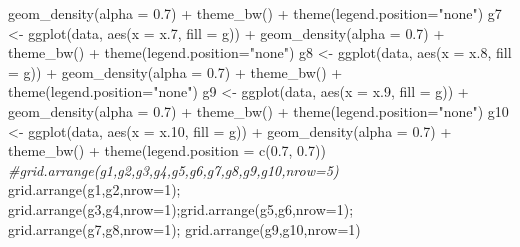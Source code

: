 \documentclass[
]{article}
\newenvironment{Shaded}{\begin{snugshade}}{\end{snugshade}}
\newcommand{\AttributeTok}[1]{\textcolor[rgb]{0.77,0.63,0.00}{#1}}
\newcommand{\CommentTok}[1]{\textcolor[rgb]{0.56,0.35,0.01}{\textit{#1}}}
\newcommand{\DecValTok}[1]{\textcolor[rgb]{0.00,0.00,0.81}{#1}}
\newcommand{\FloatTok}[1]{\textcolor[rgb]{0.00,0.00,0.81}{#1}}
\newcommand{\FunctionTok}[1]{\textcolor[rgb]{0.00,0.00,0.00}{#1}}
\newcommand{\NormalTok}[1]{#1}
\newcommand{\OtherTok}[1]{\textcolor[rgb]{0.56,0.35,0.01}{#1}}
\newcommand{\SpecialCharTok}[1]{\textcolor[rgb]{0.00,0.00,0.00}{#1}}
\newcommand{\StringTok}[1]{\textcolor[rgb]{0.31,0.60,0.02}{#1}}
\begin{document}
\begin{Shaded}
\begin{Highlighting}[]
  \FunctionTok{geom\_density}\NormalTok{(}\AttributeTok{alpha =} \FloatTok{0.7}\NormalTok{) }\SpecialCharTok{+} \FunctionTok{theme\_bw}\NormalTok{() }\SpecialCharTok{+}
    \FunctionTok{theme}\NormalTok{(}\AttributeTok{legend.position=}\StringTok{"none"}\NormalTok{)}
\NormalTok{g7 }\OtherTok{\textless{}{-}} \FunctionTok{ggplot}\NormalTok{(data, }\FunctionTok{aes}\NormalTok{(}\AttributeTok{x =}\NormalTok{ x}\FloatTok{.7}\NormalTok{, }\AttributeTok{fill =}\NormalTok{ g)) }\SpecialCharTok{+}
  \FunctionTok{geom\_density}\NormalTok{(}\AttributeTok{alpha =} \FloatTok{0.7}\NormalTok{) }\SpecialCharTok{+} \FunctionTok{theme\_bw}\NormalTok{() }\SpecialCharTok{+}
    \FunctionTok{theme}\NormalTok{(}\AttributeTok{legend.position=}\StringTok{"none"}\NormalTok{)}
\NormalTok{g8 }\OtherTok{\textless{}{-}} \FunctionTok{ggplot}\NormalTok{(data, }\FunctionTok{aes}\NormalTok{(}\AttributeTok{x =}\NormalTok{ x}\FloatTok{.8}\NormalTok{, }\AttributeTok{fill =}\NormalTok{ g)) }\SpecialCharTok{+}
  \FunctionTok{geom\_density}\NormalTok{(}\AttributeTok{alpha =} \FloatTok{0.7}\NormalTok{) }\SpecialCharTok{+} \FunctionTok{theme\_bw}\NormalTok{() }\SpecialCharTok{+}
    \FunctionTok{theme}\NormalTok{(}\AttributeTok{legend.position=}\StringTok{"none"}\NormalTok{)}
\NormalTok{g9 }\OtherTok{\textless{}{-}} \FunctionTok{ggplot}\NormalTok{(data, }\FunctionTok{aes}\NormalTok{(}\AttributeTok{x =}\NormalTok{ x}\FloatTok{.9}\NormalTok{, }\AttributeTok{fill =}\NormalTok{ g)) }\SpecialCharTok{+}
  \FunctionTok{geom\_density}\NormalTok{(}\AttributeTok{alpha =} \FloatTok{0.7}\NormalTok{) }\SpecialCharTok{+} \FunctionTok{theme\_bw}\NormalTok{() }\SpecialCharTok{+}
    \FunctionTok{theme}\NormalTok{(}\AttributeTok{legend.position=}\StringTok{"none"}\NormalTok{)}
\NormalTok{g10 }\OtherTok{\textless{}{-}} \FunctionTok{ggplot}\NormalTok{(data, }\FunctionTok{aes}\NormalTok{(}\AttributeTok{x =}\NormalTok{ x}\FloatTok{.10}\NormalTok{, }\AttributeTok{fill =}\NormalTok{ g)) }\SpecialCharTok{+}
  \FunctionTok{geom\_density}\NormalTok{(}\AttributeTok{alpha =} \FloatTok{0.7}\NormalTok{) }\SpecialCharTok{+} \FunctionTok{theme\_bw}\NormalTok{() }\SpecialCharTok{+}
    \FunctionTok{theme}\NormalTok{(}\AttributeTok{legend.position =} \FunctionTok{c}\NormalTok{(}\FloatTok{0.7}\NormalTok{, }\FloatTok{0.7}\NormalTok{))}
\CommentTok{\#grid.arrange(g1,g2,g3,g4,g5,g6,g7,g8,g9,g10,nrow=5)}
\FunctionTok{grid.arrange}\NormalTok{(g1,g2,}\AttributeTok{nrow=}\DecValTok{1}\NormalTok{); }\FunctionTok{grid.arrange}\NormalTok{(g3,g4,}\AttributeTok{nrow=}\DecValTok{1}\NormalTok{);}\FunctionTok{grid.arrange}\NormalTok{(g5,g6,}\AttributeTok{nrow=}\DecValTok{1}\NormalTok{); }\FunctionTok{grid.arrange}\NormalTok{(g7,g8,}\AttributeTok{nrow=}\DecValTok{1}\NormalTok{); }\FunctionTok{grid.arrange}\NormalTok{(g9,g10,}\AttributeTok{nrow=}\DecValTok{1}\NormalTok{)}
\end{Highlighting}
\end{Shaded}
\end{document}
